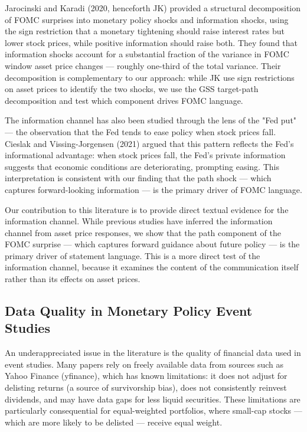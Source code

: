 \documentclass[12pt]{article}
\begin{document}
Jarocinski and Karadi (2020, henceforth JK) provided a structural decomposition of FOMC surprises into monetary policy shocks and information shocks, using the sign restriction that a monetary tightening should raise interest rates but lower stock prices, while positive information should raise both. They found that information shocks account for a substantial fraction of the variance in FOMC window asset price changes --- roughly one-third of the total variance. Their decomposition is complementary to our approach: while JK use sign restrictions on asset prices to identify the two shocks, we use the GSS target-path decomposition and test which component drives FOMC language.

The information channel has also been studied through the lens of the "Fed put" --- the observation that the Fed tends to ease policy when stock prices fall. Cieslak and Vissing-Jorgensen (2021) argued that this pattern reflects the Fed's informational advantage: when stock prices fall, the Fed's private information suggests that economic conditions are deteriorating, prompting easing. This interpretation is consistent with our finding that the path shock --- which captures forward-looking information --- is the primary driver of FOMC language.

Our contribution to this literature is to provide direct textual evidence for the information channel. While previous studies have inferred the information channel from asset price responses, we show that the path component of the FOMC surprise --- which captures forward guidance about future policy --- is the primary driver of statement language. This is a more direct test of the information channel, because it examines the content of the communication itself rather than its effects on asset prices.

\subsection{Data Quality in Monetary Policy Event Studies}

An underappreciated issue in the literature is the quality of financial data used in event studies. Many papers rely on freely available data from sources such as Yahoo Finance (yfinance), which has known limitations: it does not adjust for delisting returns (a source of survivorship bias), does not consistently reinvest dividends, and may have data gaps for less liquid securities. These limitations are particularly consequential for equal-weighted portfolios, where small-cap stocks --- which are more likely to be delisted --- receive equal weight.
\end{document}
